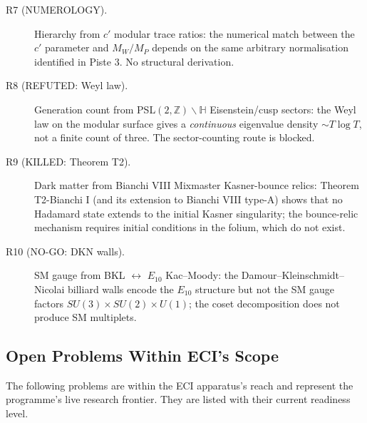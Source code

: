 \begin{description}
\item[R7 (NUMEROLOGY).]
  Hierarchy from $c'$ modular trace ratios: the numerical match between
  the $c'$ parameter and $M_W/M_P$ depends on the same arbitrary
  normalisation identified in Piste 3.  No structural derivation.

\item[R8 (REFUTED: Weyl law).]
  Generation count from PSL$(2,\mathbb{Z})\backslash\mathbb{H}$ Eisenstein/cusp
  sectors: the Weyl law on the modular surface gives a
  \emph{continuous} eigenvalue density $\sim T \log T$, not a finite
  count of three.  The sector-counting route is blocked.

\item[R9 (KILLED: Theorem T2).]
  Dark matter from Bianchi VIII Mixmaster Kasner-bounce relics:
  Theorem T2-Bianchi I (and its extension to Bianchi VIII type-A)
  shows that no Hadamard state extends to the initial Kasner singularity;
  the bounce-relic mechanism requires initial conditions in the folium,
  which do not exist.

\item[R10 (NO-GO: DKN walls).]
  SM gauge from BKL $\leftrightarrow$ $E_{10}$ Kac--Moody:
  the Damour--Kleinschmidt--Nicolai billiard walls encode the
  $E_{10}$ structure but not the SM gauge factors $SU(3)\times SU(2)
  \times U(1)$; the coset decomposition does not produce SM multiplets.

\end{description}

\subsection{Open Problems Within ECI's Scope}
\label{subsec:open_within}

The following problems are within the ECI apparatus's reach and represent
the programme's live research frontier.  They are listed with their
current readiness level.

